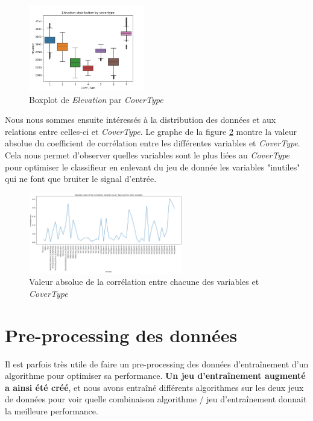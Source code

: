\documentclass{article}
\begin{document}
\begin{figure}[h]
  \centering
  \includegraphics[width=0.45\textwidth]{Elevation_distribution_by_covertype.png}
    \caption{Boxplot de \textit{Elevation} par \textit{CoverType}}
  \label{fig:boxplot}
\end{figure}

Nous nous sommes ensuite intéressés à la distribution des données et aux relations entre celles-ci et \textit{CoverType}. Le graphe de la figure \ref{fig:corr} montre la valeur absolue du coefficient de corrélation entre les différentes variables et \textit{CoverType}. Cela nous permet d'observer quelles variables sont le plus liées au \textit{CoverType} pour optimiser le classifieur en enlevant du jeu de donnée les variables "inutiles" qui ne font que bruiter le signal d'entrée.

\begin{figure}[h]
  \centering
  \includegraphics[width=0.6\textwidth]{correlation.png}
    \caption{Valeur absolue de la corrélation entre chacune des variables et \textit{CoverType}}
  \label{fig:corr}
\end{figure}

\newpage
\section {Pre-processing des données}

Il est parfois très utile de faire un pre-processing des données d'entraînement d'un algorithme pour optimiser sa performance. \textbf{Un jeu d'entraînement augmenté a ainsi été créé}, et nous avons entraîné différents algorithmes sur les deux jeux de données pour voir quelle combinaison algorithme / jeu d'entraînement donnait la meilleure performance.
\end{document}
